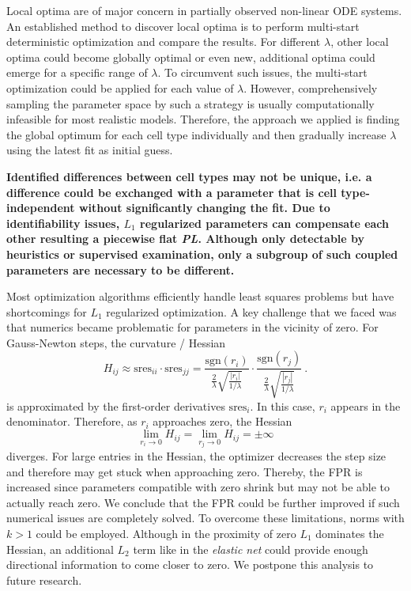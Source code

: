 \documentclass{bioinfo}
\begin{document}
Local optima are of major concern in partially observed non-linear ODE systems.
An established method to discover local optima is to perform multi-start deterministic optimization and compare the results.
For different $\lambda$, other local optima could become globally optimal or even new, additional optima could emerge for a specific range of $\lambda$.
To circumvent such issues, the multi-start optimization could be applied for each value of $\lambda$.
However, comprehensively sampling the parameter space by such a strategy is usually computationally infeasible for most realistic models.
Therefore, the approach we applied is finding the global optimum for each cell type individually and then gradually increase $\lambda$ using the latest fit as initial guess.

{\bf Identified differences between cell types may not be unique, i.e. a difference could be exchanged with a parameter that is cell type-independent without significantly changing the fit.
Due to identifiability issues, $L_1$ regularized parameters can compensate each other resulting a piecewise flat \emph{PL}.
Although only detectable by heuristics or supervised examination, only a subgroup of such coupled parameters are necessary to be different.}

Most optimization algorithms efficiently handle least squares problems but have shortcomings for $L_1$ regularized optimization.
A key challenge that we faced was that numerics became problematic for parameters in the vicinity of zero.
For Gauss-Newton steps, the curvature / Hessian
\begin{equation}
	H_{ij} \approx \text{sres}_{ii} \cdot \text{sres}_{jj} = \frac{\text{sgn}(r_i)}{\frac{2}{\lambda}\sqrt{\frac{|r_i|}{1/\lambda}}} \cdot \frac{\text{sgn}(r_j)}{\frac{2}{\lambda}\sqrt{\frac{|r_j|}{1/\lambda}}} \:.
\end{equation}
is approximated by the first-order derivatives $\text{sres}_{i}$.
In this case, $r_i$ appears in the denominator. Therefore, as $r_i$ approaches zero, the Hessian
\begin{equation}
	\lim_{r_i \rightarrow 0} H_{ij} = \lim_{r_j \rightarrow 0} H_{ij} = \pm \infty
\end{equation}
diverges.
For large entries in the Hessian, the optimizer decreases the step size and therefore may get stuck when approaching zero.
Thereby, the FPR is increased since parameters compatible with zero shrink but may not be able to actually reach zero.
We conclude that the FPR could be further improved if such numerical issues are completely solved. %
To overcome these limitations, norms with $k>1$ could be employed.
Although in the proximity of zero $L_1$ dominates the Hessian, an additional $L_2$ term like in the \emph{elastic net} could provide enough directional information to come closer to zero.
We postpone this analysis to future research.
\end{document}
